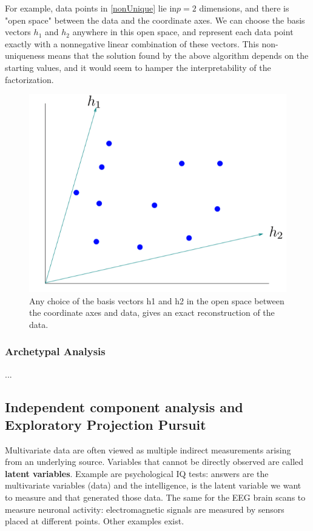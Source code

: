 For example, data points in \autoref{nonUnique} lie in$ p = 2$ dimensions, and there is "open space" between the data and the coordinate axes. We can choose the basis vectors $h_1$ and $h_2$ anywhere in this open space, and represent each data point exactly with a nonnegative linear combination of these vectors. This non-uniqueness means that the solution found by the above algorithm depends on the starting values, and it would seem to hamper the interpretability of the factorization.
\begin{figure}
\centering
\includegraphics[scale=0.4]{img/NonUniqueness}
\caption{Any choice of the basis vectors h1 and h2 in the open space between the coordinate axes and data, gives an exact reconstruction of the data.}
\label{nonUnique}
\end{figure}

\subsubsection{Archetypal Analysis}
...

\subsection{Independent component analysis and Exploratory Projection Pursuit}
Multivariate data are often viewed as multiple indirect measurements arising from an underlying source. Variables that cannot be directly observed are called \textbf{latent variables}. Example are psychological IQ tests: answers are the multivariate variables (data) and the intelligence, is the latent variable we want to measure and that generated those data. The same for the EEG brain scans to measure neuronal activity: electromagnetic signals are measured by sensors placed at different points. Other examples exist.

